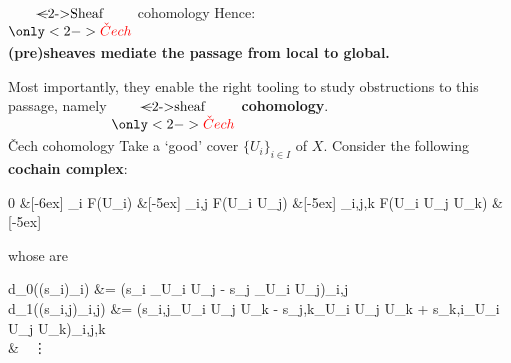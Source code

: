 \begin{frame}{$\Underset{\only<2->{\color{red}\check{C}ech}}{\text{\sout<2->{Sheaf}}}$ cohomology}
	Hence:
	\begin{center}
	\bfseries
		(pre)sheaves mediate the passage from local to global.
	\end{center}

	Most importantly, they enable the right tooling to study obstructions to this passage, namely \textbf{$\Underset{\only<2->{\color{red}\check{C}ech}}{\text{\sout<2->{sheaf}}}$ cohomology}.

	\vfill

\end{frame}

\begin{frame}{\v{C}ech cohomology}
	Take a `good' cover $\{U_i\}_{i \in I}$ of $X$. 
	\vfill
	Consider the following \textbf{cochain complex}: 
	\vspace{4ex}
	\begin{diagram*}
		0  \&[-6ex] \prod_i F(U_i)  \&[-5ex] \prod_{i,j} F(U_i \cap U_j)  \&[-5ex] \prod_{i,j,k} F(U_i \cap U_j \cap U_k)  \&[-5ex] \cdots
	\end{diagram*}
	\vfill
	whose  are
	\vspace{4ex}
	\begin{eqalign*}
		d_0((s_i)_i) &= (s_i \vert_{U_i \cap U_j} - s_j \vert_{U_i \cap U_j})_{i,j}\\
		d_1((s_{i,j})_{i,j}) &= (s_{i,j}\vert_{U_i \cap U_j \cap U_k} - s_{j,k}\vert_{U_i \cap U_j \cap U_k} + s_{k,i}\vert_{U_i \cap U_j \cap U_k})_{i,j,k}\\
		&\ \ \vdots
	\end{eqalign*}
	\vfill
\end{frame}

